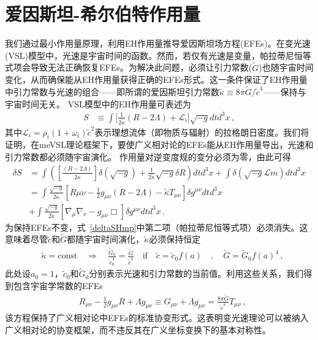 \documentclass[jkps,preprint,fleqn]{revtex4}
\newcommand{\tc}{\tilde{c}}
\newcommand{\tG}{\tilde{G}}
\newcommand{\tkapp}{\tilde{\kappa}}
\begin{document}
\section{爱因斯坦-希尔伯特作用量}\label{sec:HEaction}

我们通过最小作用量原理，利用EH作用量推导爱因斯坦场方程(EFEs)。在变光速(VSL)模型中，光速是宇宙时间的函数。然而，若仅有光速是变量，帕拉蒂尼恒等式项会导致无法正确恢复EFEs。为解决此问题，必须让引力常数($\tG$)也随宇宙时间变化，从而确保能从EH作用量获得正确的EFEs形式\cite{Lee:2020zts}。这一条件保证了EH作用量中引力常数与光速的组合——即所谓的爱因斯坦引力常数$\tkapp \equiv 8 \pi \tG/\tc^4$——保持与宇宙时间无关。
VSL模型中的EH作用量可表述为
\begin{align} S &\equiv \int \Biggl[ \frac{1}{2 \tkapp} \left( R - 2 \Lambda \right) + \mathcal{L}_i \Biggr] \sqrt{-g} dt d^3x \label{SHmp} \,, \end{align}
其中$\mathcal{L}_i = \rho_i (1 + \omega_i) \tc^2$表示理想流体（即物质与辐射）的拉格朗日密度。我们将证明，在meVSL理论框架下，要使广义相对论的EFEs能从EH作用量导出，光速和引力常数都必须随宇宙演化。
作用量对逆变度规的变分必须为零，由此可得
\begin{align} \delta S &= \int \left( \left[ \frac{\left( R - 2 \Lambda \right)}{2 \tkapp} \right] \delta \left( \sqrt{-g} \right)  + \frac{1}{2\tkapp} \sqrt{-g} \delta R \right) dt d^3 x + \int \delta \left( \sqrt{-g} \mathcal{L}{m} \right) dt d^3 x \nonumber \\ &= \int \frac{\sqrt{-g}}{2 \tkapp} \left[ R{\mu\nu} - \frac{1}{2} g_{\mu\nu} \left( R - 2 \Lambda \right) - \tkapp T_{\mu\nu} \right] \delta g^{\mu\nu} dtd^3 x \nonumber \\ &+ \int \frac{\sqrt{-g}}{2 \tkapp} \left[ \nabla_{\mu} \nabla_{\nu} - g_{\mu\nu} \Box \right] \delta g^{\mu\nu} dtd^3 x \label{deltaSHmp} \,. \end{align}
为保持EFEs不变，式~\eqref{deltaSHmp}中第二项（帕拉蒂尼恒等式项）必须消失。这意味着尽管$\tc$和$\tG$都随宇宙时间演化，$\tkapp$必须保持恒定
\begin{align}
&\tkapp = \text{const} \quad \Rightarrow \quad \frac{\tG_0}{\tc_0^4} = \frac{\tG}{\tc^4} \quad \textrm{if} \quad \tc = \tc_0 f(a) \quad , \quad \tG = \tG_{0} f(a)^4 \label{tkappaconstmp} \,,
\end{align}
此处设$a_0 = 1$，$\tc_0$和$\tG_0$分别表示光速和引力常数的当前值。利用这些关系，我们得到包含宇宙学常数的EFEs
\begin{align} &R_{\mu\nu} - \frac{1}{2} g_{\mu\nu} R + \Lambda g_{\mu\nu} \equiv G_{\mu\nu} + \Lambda g_{\mu\nu}  = \frac{8 \pi \tG}{\tc^4} T_{\mu\nu} \label{tEFEmp} \,, \end{align}
该方程保持了广义相对论中EFEs的标准协变形式。这表明变光速理论可以被纳入广义相对论的协变框架，而不违反其在广义坐标变换下的基本对称性。
\end{document}
